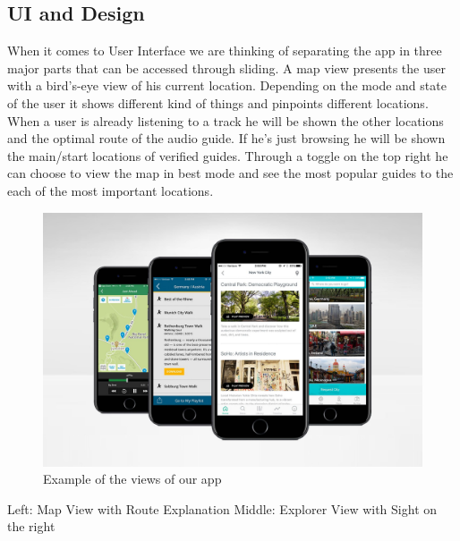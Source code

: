 \documentclass[12pt]{article}
\theoremstyle{definition}
\newenvironment{text}{
}{}
\begin{document}
\subsection{UI and Design}
\begin{text}
When it comes to User Interface we are thinking of separating the app in three major parts that can be accessed through sliding. 
A map view presents the user with a bird's-eye view of his current location. Depending on the mode and state of the user it shows different kind of things and pinpoints different locations. When a user is already listening to a track he will be shown the other locations and the optimal route of the audio guide. 
If he's just browsing he will be shown the main/start locations of verified guides. Through a toggle on the top right he can choose to view the map in best mode and see the most popular guides to the each of the most important locations.

\begin{figure}[ht]
    \caption{Example of the views of our app}
    \centering
    \includegraphics[width=\textwidth]{view_example.jpg}
\end{figure}

Left: Map View with Route Explanation\newline
Middle: Explorer View with Sight on the right
\end{text}
\end{document}
